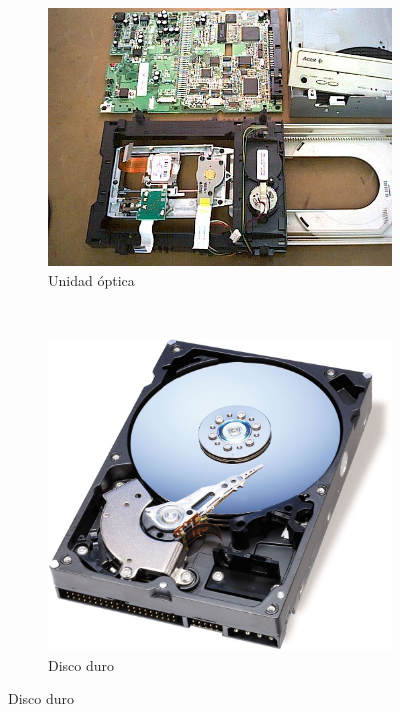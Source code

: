 \documentclass[spanish,12pt, a4paper,twoside]{paper}
\begin{document}
\begin{figure}
\centering
\begin{subfigure}[b]{0.3\textwidth}
\includegraphics[width=\textwidth]{recursos/cdrom2.jpg}
\caption{Unidad óptica}
\end{subfigure}
~ %
\begin{subfigure}[b]{0.3\textwidth}
\includegraphics[width=\textwidth]{recursos/disco-duro.jpg}
\caption{Disco duro}

\end{subfigure}
\end{figure}
\end{document}
